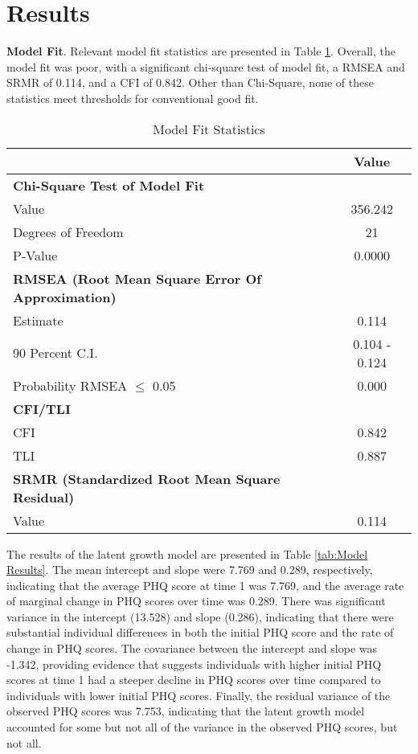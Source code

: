 \documentclass[11pt]{article}
\begin{document}
\section{Results}

\textbf{Model Fit}. Relevant model fit statistics are presented in Table \ref{tab:Model Fit}. Overall, the model fit was poor, with a significant chi-square test of model fit, a RMSEA and SRMR of 0.114, and a CFI of 0.842. Other than Chi-Square, none of these statistics meet thresholds for conventional good fit. 

\begin{table}[ht]
    \centering
    \caption{Model Fit Statistics} \label{tab:Model Fit}
    \begin{tabular}{l c}
    \toprule
    & \textbf{Value} \\
    \midrule
    \textbf{Chi-Square Test of Model Fit} & \\
    Value & 356.242 \\
    Degrees of Freedom & 21 \\
    P-Value & 0.0000 \\
    \midrule
    \textbf{RMSEA (Root Mean Square Error Of Approximation)} & \\
    Estimate & 0.114 \\
    90 Percent C.I. & 0.104 - 0.124 \\
    Probability RMSEA $\leq$ 0.05 & 0.000 \\
    \midrule
    \textbf{CFI/TLI} & \\
    CFI & 0.842 \\
    TLI & 0.887 \\
    \midrule
    \textbf{SRMR (Standardized Root Mean Square Residual)} & \\
    Value & 0.114 \\
    \bottomrule
    \end{tabular}
\end{table}

The results of the latent growth model are presented in Table \ref{tab:Model Results}. 
The mean intercept and slope were 7.769 and 0.289, respectively, indicating that the average PHQ score at time 1 was 7.769, and the average rate of marginal change in PHQ scores over time was 0.289. 
There was significant variance in the intercept (13.528) and slope (0.286), indicating that there were substantial individual differences in both the initial PHQ score and the rate of change in PHQ scores. 
The covariance between the intercept and slope was -1.342, providing evidence that suggests individuals with higher initial PHQ scores at time 1 had a steeper decline in PHQ scores over time compared to individuals with lower initial PHQ scores.
Finally, the residual variance of the observed PHQ scores was 7.753, indicating that the latent growth model accounted for some but not all of the variance in the observed PHQ scores, but not all.
\end{document}
